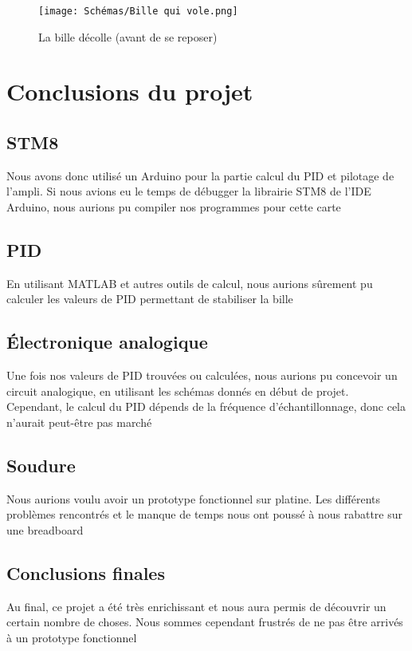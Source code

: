 \documentclass[11pt,a4paper]{article}
\begin{document}
\begin{figure} [H]
\begin{center}
\texttt{[image: Schémas/Bille qui vole.png]} 
\end{center}
\caption{La bille décolle (avant de se reposer)}
\end{figure}

\section{Conclusions du projet}
\subsection{STM8}
Nous avons donc utilisé un Arduino pour la partie calcul du PID et pilotage de l'ampli. Si nous avions eu le temps de débugger la librairie STM8 de l'IDE Arduino, nous aurions pu compiler nos programmes pour cette carte

\subsection{PID}
En utilisant MATLAB et autres outils de calcul, nous aurions sûrement pu calculer les valeurs de PID permettant de stabiliser la bille

\subsection{Électronique analogique}
Une fois nos valeurs de PID trouvées ou calculées, nous aurions pu concevoir un circuit analogique, en utilisant les schémas donnés en début de projet. Cependant, le calcul du PID dépends de la fréquence d'échantillonnage, donc cela n'aurait peut-être pas marché

\subsection{Soudure}
Nous aurions voulu avoir un prototype fonctionnel sur platine. Les différents problèmes rencontrés et le manque de temps nous ont poussé à nous rabattre sur une breadboard

\subsection{Conclusions finales}
Au final, ce projet a été très enrichissant et nous aura permis de découvrir un certain nombre de choses. Nous sommes cependant frustrés de ne pas être arrivés à un prototype fonctionnel
\end{document}
